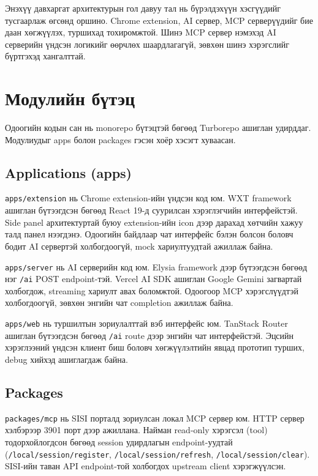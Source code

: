 Энэхүү давхаргат архитектурын гол давуу тал нь бүрэлдэхүүн хэсгүүдийг тусгаарлаж өгсөнд оршино. Chrome extension, AI сервер, MCP серверүүдийг бие даан хөгжүүлэх, туршихад тохиромжтой. Шинэ MCP сервер нэмэхэд AI серверийн үндсэн логикийг өөрчлөх шаардлагагүй, зөвхөн шинэ хэрэгслийг бүртгэхэд хангалттай.

\section{Модулийн бүтэц}

Одоогийн кодын сан нь monorepo бүтэцтэй бөгөөд Turborepo ашиглан удирддаг. Модулиудыг apps болон packages гэсэн хоёр хэсэгт хуваасан.

\subsection{Applications (apps)}

\texttt{apps/extension} нь Chrome extension-ийн үндсэн код юм. WXT framework ашиглан бүтээгдсэн бөгөөд React 19-д суурилсан хэрэглэгчийн интерфейстэй. Side panel архитектуртай буюу extension-ийн icon дээр дарахад хөтчийн хажуу талд панел нээгдэнэ. Одоогийн байдлаар чат интерфейс бэлэн болсон боловч бодит AI сервертэй холбогдоогүй, mock хариултуудтай ажиллаж байна.

\texttt{apps/server} нь AI серверийн код юм. Elysia framework дээр бүтээгдсэн бөгөөд нэг \texttt{/ai} POST endpoint-тэй. Vercel AI SDK ашиглан Google Gemini загвартай холбогдож, streaming хариулт авах боломжтой. Одоогоор MCP хэрэгслүүдтэй холбогдоогүй, зөвхөн энгийн чат completion ажиллаж байна.

\texttt{apps/web} нь туршилтын зориулалттай вэб интерфейс юм. TanStack Router ашиглан бүтээгдсэн бөгөөд \texttt{/ai} route дээр энгийн чат интерфейстэй. Эцсийн хэрэглээний үндсэн клиент биш боловч хөгжүүлэлтийн явцад прототип турших, debug хийхэд ашиглагдаж байна.

\subsection{Packages}

\texttt{packages/mcp} нь SISI порталд зориулсан локал MCP сервер юм. HTTP сервер хэлбэрээр 3901 порт дээр ажиллана. Найман read-only хэрэгсэл (tool) тодорхойлогдсон бөгөөд session удирдлагын endpoint-уудтай (\texttt{/local/session/register}, \texttt{/local/session/refresh}, \texttt{/local/session/clear}). SISI-ийн таван API endpoint-той холбогдох upstream client хэрэгжүүлсэн.

